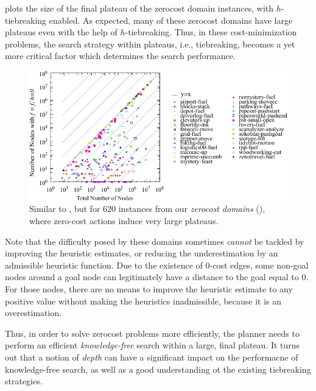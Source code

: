  plots the size of the final plateau of the
zerocost domain instances, with $h$-tiebreaking enabled.  As expected,
many of these zerocost domains have large plateaus even with the help of
$h$-tiebreaking.  Thus, in these cost-minimization problems, the search
strategy within plateaus, i.e., tiebreaking, becomes a yet more critical
factor which determines the search performance.

\begin{figure}[htbp]
  \centering
  \includegraphics{tables/aaai16-frontier/zerocost/lmcut_frontier-front.pdf}
  \caption{Similar to , but for 620 instances from our 
  \emph{zerocost domains} (),
  where zero-cost actions induce very large plateaus.
 }
 \label{fig:plateau-zerocost}
\end{figure}

Note that the difficulty posed by these domains sometimes \emph{cannot}
be tackled by improving the heuristic estimates, or reducing the
underestimation by an admissible heuristic function.  Due to the
existence of 0-cost edges, some non-goal nodes around a goal node can
legitimately have a distance to the goal equal to 0. For those nodes,
there are no means to improve the heuristic estimate to any positive
value without making the heuristics inadmissible, because it is
an overestimation.

Thus, in order to solve zerocost problems more efficiently, the planner
needs to perform an efficient \emph{knowledge-free} search within a
large, final plateau. It turns out that a notion of \emph{depth} can
have a significant impact on the performacne of knowledge-free search,
as well as a good understanding ot the existing tiebreaking strategies.
